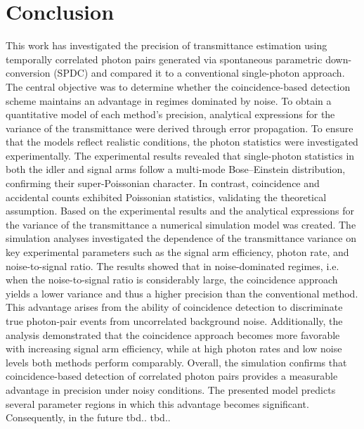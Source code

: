 \section{Conclusion}
This work has investigated the precision of transmittance estimation using temporally correlated photon pairs generated via spontaneous parametric down-conversion (SPDC) and compared it to a conventional single-photon approach. The central objective was to determine whether the coincidence-based detection scheme maintains an advantage in regimes dominated by noise. \newline
To obtain a quantitative model of each method’s precision, analytical expressions for the variance of the transmittance were derived through error propagation. To ensure that the models reflect realistic conditions, the photon statistics were investigated experimentally. \newline
The experimental results revealed that single-photon statistics in both the idler and signal arms follow a multi-mode Bose–Einstein distribution, confirming their super-Poissonian character. In contrast, coincidence and accidental counts exhibited Poissonian statistics, validating the theoretical assumption. Based on the experimental results and the analytical expressions for the variance of the transmittance a numerical simulation model was created. \newline
The simulation analyses investigated the dependence of the transmittance variance on key experimental parameters such as the signal arm efficiency, photon rate, and noise-to-signal ratio. The results showed that in noise-dominated regimes, i.e. when the noise-to-signal ratio is considerably large, the coincidence approach yields a lower variance and thus a higher precision than the conventional method. This advantage arises from the ability of coincidence detection to discriminate true photon-pair events from uncorrelated background noise. Additionally, the analysis demonstrated that the coincidence approach becomes more favorable with increasing signal arm efficiency, while at high photon rates and low noise levels both methods perform comparably. \newline
Overall, the simulation confirms that coincidence-based detection of correlated photon pairs provides a measurable advantage in precision under noisy conditions. The presented model predicts several parameter regions in which this advantage becomes significant. Consequently, in the future tbd.. tbd..


